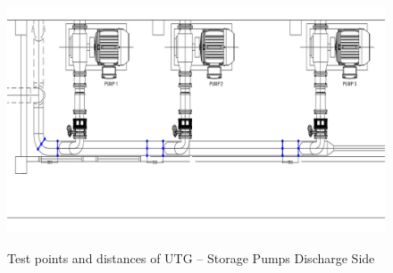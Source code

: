 \begin{figure}[!htb]
	\includegraphics[scale=0.3]{figures/ch04_fig_utgsp} \\
	\caption{Test points and distances of UTG – Storage Pumps Discharge Side}
	\label{ch04_fig_utgsp} 
\end{figure}


%			

